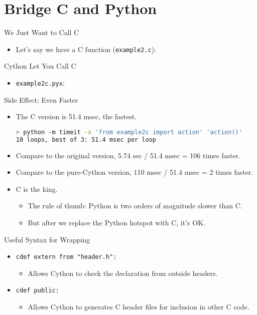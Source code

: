 \documentclass[dvips,xcolor=pst,14pt]{beamer}
\begin{document}
\section{
Bridge C and Python
}

\begin{frame}[fragile]{
%
We Just Want to Call C
%
}
\begin{itemize}
\item Let's say we have a C function ({\color{red}\verb+example2.c+}):

\end{itemize}
\end{frame}

\begin{frame}[fragile]{
%
Cython Let You Call C
%
}
\begin{itemize}
\item {\color{red}\verb+example2c.pyx+}:

\end{itemize}
\end{frame}

\begin{frame}[fragile]{
%
Side Effect: Even Faster
%
}
\begin{itemize}
\item The C version is 51.4 msec, the fastest.
\begin{lstlisting}[language=bash]
> python -m timeit -s 'from example2c import action' 'action()'
10 loops, best of 3: 51.4 msec per loop
\end{lstlisting}
\item Compare to the original version, 5.74 sec / 51.4 msec = 106 times faster.
\item Compare to the pure-Cython version, 110 msec / 51.4 msec = 2 times
faster. 
\item \alert{C is the king}.
\begin{itemize}
  \item The rule of thumb: Python is \alert{two orders of magnitude slower}
  than C.
  \item But after we replace the Python hotspot with C, it's OK.
\end{itemize}
\end{itemize}
\end{frame}

\begin{frame}[fragile]{
%
Useful Syntax for Wrapping
%
}
\begin{itemize}
\item \verb+cdef extern from "header.h":+
\begin{itemize}
  \item Allows Cython to check the declaration from outside headers.
\end{itemize}
\item \verb+cdef public:+
\begin{itemize}
  \item Allows Cython to generates C header files for inclusion in other C
  code.
\end{itemize}
\end{itemize}
\end{frame}
\end{document}
